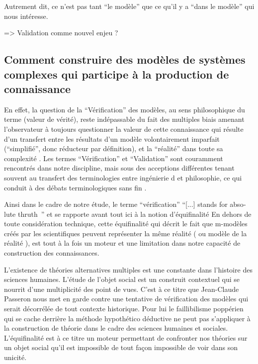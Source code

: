 {Autrement dit, ce n'est pas tant \enquote{le modèle} que ce qu'il y a \enquote{dans le modèle} qui nous intéresse. \autocite{Sanders2000} 

=> Validation comme nouvel enjeu ?

\subsection{Comment construire des modèles de systèmes complexes qui participe à la production de connaissance}

En effet, la question de la \enquote{Vérification} des modèles, au sens philosophique du terme (valeur de vérité), reste indépassable du fait des multiples biais amenant l'observateur à toujours questionner la valeur de cette connaissance qui résulte d'un transfert entre les résultats d'un modèle volontairement imparfait (\enquote{simplifié}, donc réducteur par définition), et la \enquote{réalité} dans toute sa complexité \autocite{OSullivan2004}. Les termes \enquote{Vérification} et  \enquote{Validation} sont couramment rencontrés dans notre discipline, mais sous des acceptions différentes tenant souvent au transfert des terminologies entre ingénierie \autocite{Sargent1984} d\autocite{Balci1998} et philosophie, ce qui conduit à  des débats terminologiques sans fin \autocite{David2009}. 

Ainsi dans le cadre de notre étude, le terme \enquote{vérification}  \foreignquote{english}{[...] stands for absolute thruth } \autocite{David2009} \autocite{Oreskes1994} et se rapporte avant tout ici à la notion d'équifinalité \autocite{OSullivan2004} En dehors de toute considération technique, cette équifinalité qui décrit le fait que m-modèles créés par les scientifiques peuvent représenter la même réalité ( ou modèle de la réalité ), est tout à la fois un moteur et une limitation dans notre capacité de construction des connaissances. 

L’existence de théories alternatives multiples est une constante dans l’histoire des sciences humaines. L'étude de l'objet social est un construit contextuel qui se nourrit d'une multiplicité des point de vues. C'est à ce titre que Jean-Claude Passeron \autocite{Passeron2006} nous met en garde contre une tentative de vérification des modèles qui serait décorrélée de tout contexte historique. Pour lui le faillibilisme poppérien qui se cache derrière la méthode hypothético déductive ne peut pas s'appliquer à la construction de théorie dans le cadre des sciences humaines et sociales. L'équifinalité est à ce titre un moteur permettant de confronter nos théories sur un objet social  qu'il est impossible de tout façon impossible de voir dans son unicité. 

}
